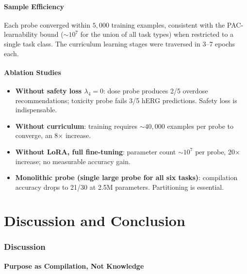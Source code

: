 \documentclass[11pt,twocolumn,a4paper]{article}
\theoremstyle{definition}
\theoremstyle{remark}
\begin{document}
\subsection{Sample Efficiency}

Each probe converged within $5{,}000$ training examples, consistent with the PAC-learnability bound ($\sim\!10^7$ for the union of all task types) when restricted to a single task class. The curriculum learning stages were traversed in 3--7 epochs each.

\subsection{Ablation Studies}

\begin{itemize}[nosep,leftmargin=*]
\item \textbf{Without safety loss $\lambda_4 = 0$}: dose probe produces 2/5 overdose recommendations; toxicity probe fails 3/5 hERG predictions. Safety loss is indispensable.
\item \textbf{Without curriculum}: training requires $\sim\!40{,}000$ examples per probe to converge, an 8$\times$ increase.
\item \textbf{Without LoRA, full fine-tuning}: parameter count $\sim\!10^7$ per probe, 20$\times$ increase; no measurable accuracy gain.
\item \textbf{Monolithic probe (single large probe for all six tasks)}: compilation accuracy drops to 21/30 at 2.5M parameters. Partitioning is essential.
\end{itemize}

\part{Discussion and Conclusion}

\section{Discussion}
\label{sec:discussion}

\subsection{Purpose as Compilation, Not Knowledge}
\end{document}
